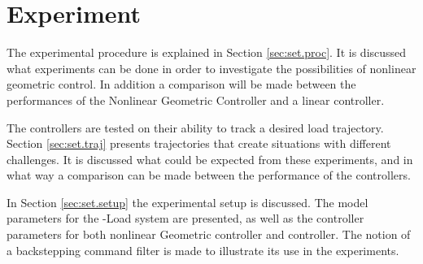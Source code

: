 \chapter{Experiment}\label{ch:setup}
The experimental procedure is explained in Section \ref{sec:set.proc}. 
It is discussed what experiments can be done in order to investigate the possibilities of nonlinear geometric control.
In addition a comparison will be made between the performances of the Nonlinear Geometric Controller and a linear  controller.

The controllers are tested on their ability to track a desired load trajectory. 
Section \ref{sec:set.traj} presents trajectories that create situations with different challenges.
It is discussed what could be expected from these experiments, and in what way a comparison can be made between the performance of the controllers.

In Section \ref{sec:set.setup} the experimental setup is discussed. 
The model parameters for the -Load system are presented, as well as the controller parameters for both nonlinear Geometric controller and  controller.
The notion of a backstepping command filter is made to illustrate its use in the experiments.


